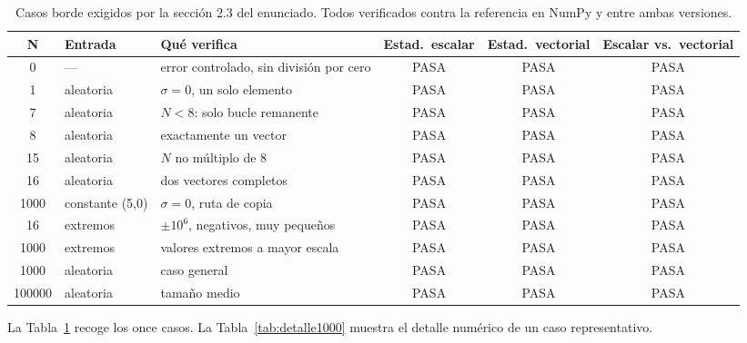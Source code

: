\documentclass[journal]{IEEEtran}
\begin{document}
\begin{table}[ht]
\centering
\caption{Casos borde exigidos por la sección 2.3 del enunciado. Todos
  verificados contra la referencia en NumPy y entre ambas versiones.}
\label{tab:casos}
\footnotesize
\begin{tabular}{|c|l|l|c|c|c|}
\hline
\textbf{N} & \textbf{Entrada} & \textbf{Qué verifica} &
\textbf{Estad.\ escalar} & \textbf{Estad.\ vectorial} &
\textbf{Escalar vs.\ vectorial} \\ \hline
0      & ---             & error controlado, sin división por cero & PASA & PASA & PASA \\ \hline
1      & aleatoria       & $\sigma = 0$, un solo elemento            & PASA & PASA & PASA \\ \hline
7      & aleatoria       & $N < 8$: solo bucle remanente             & PASA & PASA & PASA \\ \hline
8      & aleatoria       & exactamente un vector                     & PASA & PASA & PASA \\ \hline
15     & aleatoria       & $N$ no múltiplo de 8                    & PASA & PASA & PASA \\ \hline
16     & aleatoria       & dos vectores completos                    & PASA & PASA & PASA \\ \hline
1000   & constante (5,0) & $\sigma = 0$, ruta de copia               & PASA & PASA & PASA \\ \hline
16     & extremos        & $\pm 10^6$, negativos, muy pequeños     & PASA & PASA & PASA \\ \hline
1000   & extremos        & valores extremos a mayor escala           & PASA & PASA & PASA \\ \hline
1000   & aleatoria       & caso general                              & PASA & PASA & PASA \\ \hline
100000 & aleatoria       & tamaño medio                            & PASA & PASA & PASA \\ \hline
\end{tabular}
\end{table}

La Tabla~\ref{tab:casos} recoge los once casos. La
Tabla~\ref{tab:detalle1000} muestra el detalle numérico de un caso
representativo.
\end{document}
